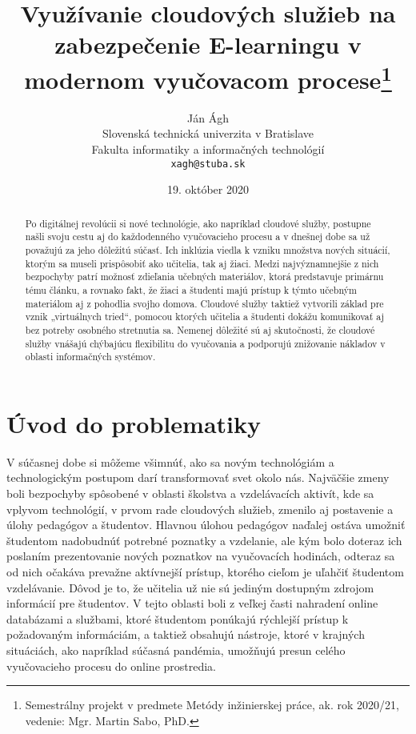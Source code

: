 \documentclass[10pt,slovak,a4paper]{article}%
\title{Využívanie cloudových služieb na zabezpečenie E-learningu v modernom vyučovacom procese\thanks{Semestrálny projekt v predmete Metódy inžinierskej práce, ak. rok 2020/21, vedenie: Mgr. Martin Sabo, PhD.}}
\author{Ján Ágh\\[2pt]
	{\small Slovenská technická univerzita v Bratislave}\\
	{\small Fakulta informatiky a informačných technológií}\\
	{\small \texttt{xagh@stuba.sk}}
	}
\date{\small 19. október 2020}
\begin{document}
\maketitle

\begin{abstract}

Po digitálnej revolúcii si nové technológie, ako napríklad cloudové služby, postupne
našli svoju cestu aj do každodenného vyučovacieho procesu a v dnešnej dobe sa už považujú
za jeho dôležitú súčasť. Ich inklúzia viedla k vzniku množstva nových situácií, ktorým sa
museli prispôsobiť ako učitelia, tak aj žiaci. Medzi najvýznamnejšie z nich bezpochyby patrí
možnosť zdieľania učebných materiálov, ktorá predstavuje primárnu tému článku, a rovnako
fakt, že žiaci a študenti majú prístup k týmto učebným materiálom aj z pohodlia svojho
domova. Cloudové služby taktiež vytvorili základ pre vznik „virtuálnych tried“, pomocou
ktorých učitelia a študenti dokážu komunikovať aj bez potreby osobného stretnutia sa.
Nemenej dôležité sú aj skutočnosti, že cloudové služby vnášajú chýbajúcu flexibilitu do
vyučovania a podporujú znižovanie nákladov v oblasti informačných systémov.\cite{Babu_enrichingeducation}\cite{Koutsopoulos_schooloncloud}\cite{Narkar_cloud-basededucation}\cite{Mhouti_benefits_challenges}

\end{abstract}



\section{Úvod do problematiky}


V súčasnej dobe si môžeme všimnúť, ako sa novým technológiám a technologickým postupom darí transformovať svet okolo nás. Najväčšie zmeny boli bezpochyby spôsobené v oblasti školstva a vzdelávacích aktivít, kde sa vplyvom technológií, v prvom rade cloudových služieb, zmenilo aj postavenie a úlohy pedagógov a študentov.\cite{Koutsopoulos_schooloncloud} Hlavnou úlohou pedagógov naďalej ostáva umožniť študentom nadobudnúť potrebné poznatky a vzdelanie, ale kým bolo doteraz ich poslaním prezentovanie nových poznatkov na vyučovacích hodinách, odteraz sa od nich očakáva prevažne aktívnejší prístup, ktorého cieľom je uľahčiť študentom vzdelávanie.\cite{Koutsopoulos_schooloncloud} Dôvod je to, že učitelia už nie sú jediným dostupným zdrojom informácií pre študentov. V tejto oblasti boli z veľkej časti nahradení online databázami a službami, ktoré študentom ponúkajú rýchlejší prístup k požadovaným informáciám, a taktiež obsahujú nástroje, ktoré v krajných situáciách, ako napríklad súčasná pandémia, umožňujú presun celého vyučovacieho procesu do online prostredia.
\end{document}
